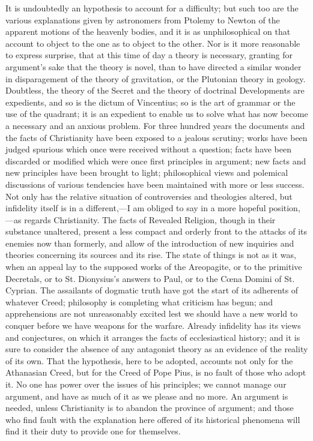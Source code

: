 It is undoubtedly an hypothesis to account for a
difficulty; but such too are the various explanations
given by astronomers from Ptolemy to Newton of the
apparent motions of the heavenly bodies, and it is as
unphilosophical on that account to object to the one as
to object to the other. Nor is it more reasonable to
express surprise, that at this time of day a theory is
necessary, granting for argument's sake that the theory
is novel, than to have directed a similar wonder in
disparagement of the theory of gravitation, or the
Plutonian theory in geology. Doubtless, the theory of the
Secret and the theory of doctrinal Developments are
expedients, and so is the dictum of Vincentius; so is the
art of grammar or the use of the quadrant; it is an
expedient to enable us to solve what has now become a
necessary and an anxious problem. For three hundred years
the documents and the facts of Christianity have been
exposed to a jealous scrutiny; works have been judged
spurious which once were received without a question;
facts have been discarded or modified which were once
first principles in argument; new facts and new
principles have been brought to light; philosophical
views and polemical discussions of various tendencies
have been maintained with more or less success. Not only
has the relative situation of controversies and
theologies altered, but infidelity itself is in a
different,—I am obliged to say in a more hopeful
position,—as regards Christianity. The facts of
Revealed Religion, though in their substance unaltered,
present a less compact and orderly front to the attacks
of its enemies now than formerly, and allow of the
introduction of new inquiries and theories concerning its
sources and its rise. The state of things is not as it
was, when an appeal lay to the supposed works of the
Areopagite, or to the primitive Decretals, or to St.
Dionysius's answers to Paul, or to the Cœna Domini of
St. Cyprian. The assailants of dogmatic truth have got
the start of its adherents of whatever Creed; philosophy
is completing what criticism has begun; and apprehensions
are not unreasonably excited lest we should have a new
world to conquer before we have weapons for the warfare.
Already infidelity has its views and conjectures, on
which it arranges the facts of ecclesiastical history;
and it is sure to consider the absence of any antagonist
theory as an evidence of the reality of its own. That the
hypothesis, here to be adopted, accounts not only for the
Athanasian Creed, but for the Creed of Pope Pius, is no
fault of those who adopt it. No one has power over the
issues of his principles; we cannot manage our argument,
and have as much of it as we please and no more. An
argument is needed, unless Christianity is to abandon the
province of argument; and those who find fault with the
explanation here offered of its historical phenomena will
find it their duty to provide one for themselves.

